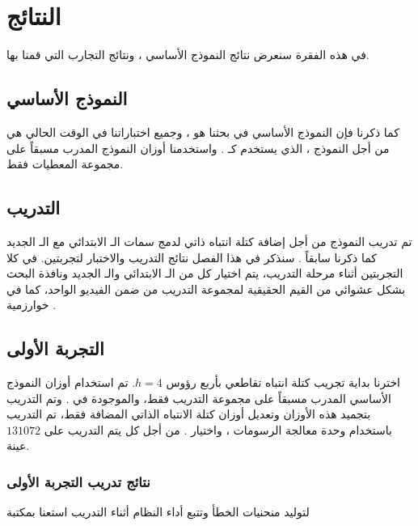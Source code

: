 \section{النتائج}
في هذه الفقرة سنعرض نتائج النموذج الأساسي 
،
ونتائج التجارب التي قمنا بها.
\subsection{النموذج الأساسي
}
كما ذكرنا فإن النموذج الأساسي في بحثنا هو
،
وجميع اختباراتنا في الوقت الحالي هي من أجل النموذج
،
الذي يستخدم 
كـ
.
واستخدمنا أوزان النموذج المدرب مسبقاً
على مجموعة المعطيات 
فقط.
\subsection{التدريب}
تم تدريب النموذج من أجل إضافة كتلة انتباه ذاتي لدمج سمات الـ 
الابتدائي مع الـ
الجديد كما ذكرنا سابقاً .
سنذكر في هذا الفصل نتائج التدريب والاختبار لتجربتين.
في كلا التجربتين أثناء مرحلة التدريب، يتم اختيار كل من الـ 
الابتدائي والـ
الجديد ونافذة البحث بشكل عشوائي من القيم الحقيقية لمجموعة التدريب من ضمن الفيديو الواحد، كما في خوارزمية
.
\newline
\subsection{التجربة الأولى}
اخترنا بداية تجريب كتلة انتباه تقاطعي بأربع رؤوس
$h = 4$.
تم استخدام أوزان النموذج الأساسي المدرب مسبقاً على مجموعة التدريب 
فقط، والموجودة في 
.
وتم التدريب بتجميد هذه الأوزان وتعديل أوزان كتلة الانتباه الذاتي المضافة فقط، 
تم التدريب باستخدام وحدة معالجة الرسومات 
،
واختيار 
.
من أجل كل
يتم التدريب على 
$131072$ 
عينة.
\subsubsection{نتائج تدريب التجربة الأولى}
لتوليد منحنيات الخطأ وتتبع أداء النظام أثناء التدريب استعنا بمكتبة

